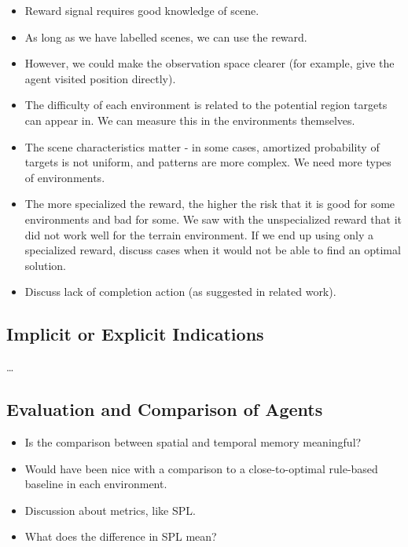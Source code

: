 \begin{itemize}
    \item Reward signal requires good knowledge of scene.
    \item As long as we have labelled scenes, we can use the reward.
    \item However, we could make the observation space clearer (for example, give the agent visited position directly).
    \item The difficulty of each environment is related to the potential region targets can appear in. We can measure this in the environments themselves.
    \item The scene characteristics matter - in some cases, amortized probability of targets is not uniform, and patterns are more complex. We need more types of environments.
    \item The more specialized the reward, the higher the risk that it is good for some environments and bad for some. We saw with the unspecialized reward that it did not work well for the terrain environment. If we end up using only a specialized reward, discuss cases when it would not be able to find an optimal solution.
    \item Discuss lack of completion action (as suggested in related work).

\end{itemize}


\subsection{Implicit or Explicit Indications}

\dots


\subsection{Evaluation and Comparison of Agents}

\begin{itemize}
    \item Is the comparison between spatial and temporal memory meaningful?
    \item Would have been nice with a comparison to a close-to-optimal rule-based baseline in each environment.
    \item Discussion about metrics, like SPL.
    \item What does the difference in SPL mean?
\end{itemize}



